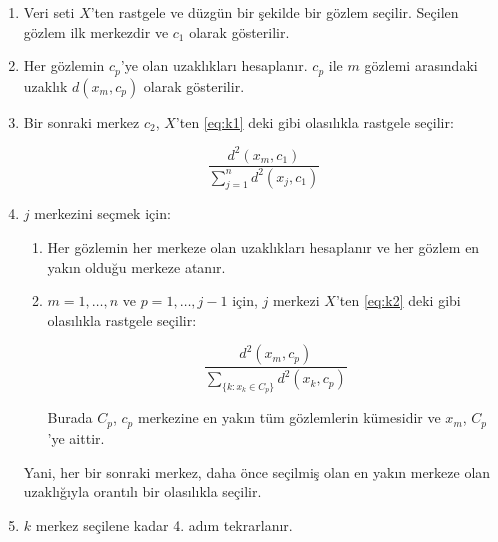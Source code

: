 \begin{enumerate}
    \item Veri seti \( X \)'ten rastgele ve düzgün bir şekilde bir gözlem seçilir. Seçilen gözlem ilk merkezdir ve \( c_1 \) olarak gösterilir.
    
    \item Her gözlemin \( c_p \)'ye olan uzaklıkları hesaplanır. \( c_p \) ile \( m \) gözlemi arasındaki uzaklık \( d(x_m, c_p) \) olarak gösterilir.
    
    \item Bir sonraki merkez \( c_2 \), \( X \)'ten \eqref{eq:k1} deki gibi olasılıkla rastgele seçilir:
    
    \begin{equation}
        \frac{d^2(x_m, c_1)}{\sum_{j=1}^n d^2(x_j, c_1)}
        \label{eq:k1}
    \end{equation}
    
    
    \item \( j \) merkezini seçmek için:
    \begin{enumerate}
        \item Her gözlemin her merkeze olan uzaklıkları hesaplanır ve her gözlem en yakın olduğu merkeze atanır.
        
        \item \( m = 1, \dots, n \) ve \( p = 1, \dots, j - 1 \) için, \( j \) merkezi \( X \)'ten \eqref{eq:k2} deki gibi olasılıkla rastgele seçilir:
        
        \begin{equation}
            \frac{d^2(x_m, c_p)}{\sum_{\{k: x_k \in C_p\}} d^2(x_k, c_p)}
            \label{eq:k2}
        \end{equation}
        
        
        Burada \( C_p \), \( c_p \) merkezine en yakın tüm gözlemlerin kümesidir ve \( x_m \), \( C_p \)'ye aittir.
    \end{enumerate}
    
    Yani, her bir sonraki merkez, daha önce seçilmiş olan en yakın merkeze olan uzaklığıyla orantılı bir olasılıkla seçilir.
    
    \item \( k \) merkez seçilene kadar 4. adım tekrarlanır.
\end{enumerate}


\begin{comment}
    Arthur ve Vassilvitskii [1], çeşitli küme yapılandırmaları için yapılan bir simülasyon çalışmasıyla, k-means++'ın Lloyd algoritmasına kıyasla daha düşük bir küme-içi kareler toplamına (noktadan-küme-merkezine olan uzaklıkların karelerinin toplamı) daha hızlı yakınsadığını göstermiştir. 

    [1] Arthur, David, and Sergi Vassilvitskii. K-means++: The Advantages of Careful Seeding. In SODA ‘07: Proceedings of the Eighteenth Annual ACM-SIAM Symposium on Discrete Algorithms, 1027–1035. Society for Industrial and Applied Mathematics, 2007.
\end{comment}

